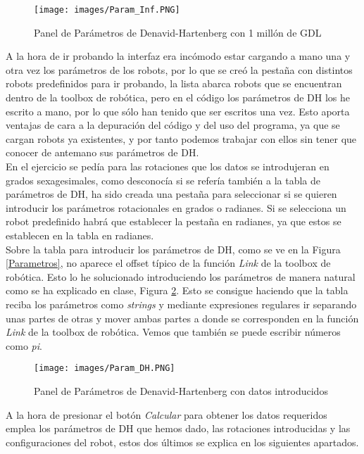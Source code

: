 \documentclass[a4paper, fontsize=11pt]{scrartcl} %
\numberwithin{equation}{section} %
\numberwithin{figure}{section} %
\numberwithin{table}{section} %
\begin{document}
	\begin{figure}[h!]
		\centering
		\texttt{[image: images/Param\_Inf.PNG]}
		\caption{Panel de Parámetros de Denavid-Hartenberg con 1 millón de GDL}
		\label{Parametros_Inf}
	\end{figure}
	\FloatBarrier
	
	A la hora de ir probando la interfaz era incómodo estar cargando a mano una y otra vez los parámetros de los robots, por lo que se creó la pestaña con distintos robots predefinidos para ir probando, la lista abarca robots que se encuentran dentro de la toolbox de robótica, pero en el código los parámetros de DH los he escrito a mano, por lo que sólo han tenido que ser escritos una vez. Esto aporta ventajas de cara a la depuración del código y del uso del programa, ya que se cargan robots ya existentes, y por tanto podemos trabajar con ellos sin tener que conocer de antemano sus parámetros de DH.\\
	
	En el ejercicio se pedía para las rotaciones que los datos se introdujeran en grados sexagesimales, como desconocía si se refería también a la tabla de parámetros de DH, ha sido creada una pestaña para seleccionar si se quieren introducir los parámetros rotacionales en grados o radianes. Si se selecciona un robot predefinido habrá que establecer la pestaña en radianes, ya que estos se establecen en la tabla en radianes.\\
	
	Sobre la tabla para introducir los parámetros de DH, como se ve en la Figura \ref{Parametros}, no aparece el offset típico de la función \textit{Link} de la toolbox de robótica. Esto lo he solucionado introduciendo los parámetros de manera natural como se ha explicado en clase, Figura \ref{Parametros_DH}. Esto se consigue haciendo que la tabla reciba los parámetros como \textit{strings} y mediante expresiones regulares ir separando unas partes de otras y mover ambas partes a donde se corresponden en la función \textit{Link} de la toolbox de robótica. Vemos que también se puede escribir números como \textit{pi}.\\
	
	\begin{figure}[h!]
		\centering
		\texttt{[image: images/Param\_DH.PNG]}
		\caption{Panel de Parámetros de Denavid-Hartenberg con datos introducidos}
		\label{Parametros_DH}
	\end{figure}
	\FloatBarrier
	
	A la hora de presionar el botón \textit{Calcular} para obtener los datos requeridos emplea los parámetros de DH que hemos dado, las rotaciones introducidas y las configuraciones del robot, estos dos últimos se explica en los siguientes apartados.\\
	
\end{document}
